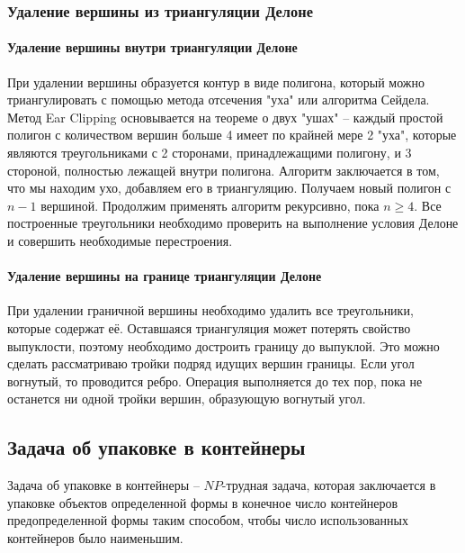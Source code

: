 \documentclass{fefu}
\begin{document}
\subsubsection{Удаление вершины из триангуляции Делоне}
\paragraph{Удаление вершины внутри триангуляции Делоне}
При удалении вершины образуется контур в виде полигона, который можно триангулировать с помощью метода отсечения 
"уха" \cite{EarClipping} или алгоритма Сейдела\cite{Seidel}. Метод Ear Clipping основывается на теореме о двух "ушах" -- 
каждый простой полигон с количеством вершин больше 4 имеет по крайней мере 2 "уха", которые являются треугольниками с 2 
сторонами, принадлежащими полигону, и 3 стороной, полностью лежащей внутри полигона. Алгоритм заключается в том, что 
мы находим ухо, добавляем его в триангуляцию. Получаем новый полигон с $n - 1$ вершиной. Продолжим применять алгоритм 
рекурсивно, пока $n \geq 4$. Все построенные треугольники необходимо проверить на выполнение условия Делоне и совершить 
необходимые перестроения.
\paragraph{Удаление вершины на границе триангуляции Делоне}
При удалении граничной вершины необходимо удалить все треугольники, которые содержат её. Оставшаяся триангуляция может 
потерять свойство выпуклости, поэтому необходимо достроить границу до выпуклой. Это можно сделать рассматриваю тройки 
подряд идущих вершин границы. Если угол вогнутый, то проводится ребро. Операция выполняется до тех пор, пока не останется 
ни одной тройки вершин, образующую вогнутый угол.
\subsection{Задача об упаковке в контейнеры}
Задача об упаковке в контейнеры -- $NP$-трудная задача, которая заключается в упаковке объектов определенной формы в 
конечное число контейнеров предопределенной формы таким способом, чтобы число использованных контейнеров было 
наименьшим.
\end{document}
